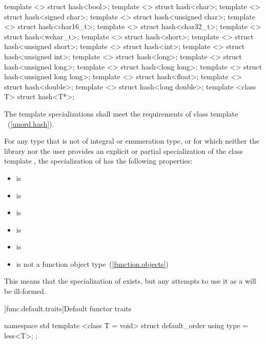 %
\begin{itemdecl}
template <> struct hash<bool>;
template <> struct hash<char>;
template <> struct hash<signed char>;
template <> struct hash<unsigned char>;
template <> struct hash<char16_t>;
template <> struct hash<char32_t>;
template <> struct hash<wchar_t>;
template <> struct hash<short>;
template <> struct hash<unsigned short>;
template <> struct hash<int>;
template <> struct hash<unsigned int>;
template <> struct hash<long>;
template <> struct hash<unsigned long>;
template <> struct hash<long long>;
template <> struct hash<unsigned long long>;
template <> struct hash<float>;
template <> struct hash<double>;
template <> struct hash<long double>;
template <class T> struct hash<T*>;
\end{itemdecl}

\begin{itemdescr}
\pnum
The template specializations shall meet the requirements of class template
~(\ref{unord.hash}).

\pnum
For any type  that is not of integral or enumeration type, or
for which neither the library nor the user provides
an explicit or partial specialization of the class template ,
the specialization of  has the following properties:
\begin{itemize}
\item {} is 
\item {} is 
\item {} is 
\item {} is 
\item {} is 
\item {} is not a function object type~(\ref{function.objects})
\end{itemize}
\begin{note} This means that the specialization of  exists,
but any attempts to use it as a  will be ill-formed. \end{note}
\end{itemdescr}

[func.default.traits]{Default functor traits}

%
\begin{codeblock}
namespace std {
  template <class T = void>
  struct default_order {
    using type = less<T>;
  };
}
\end{codeblock}

